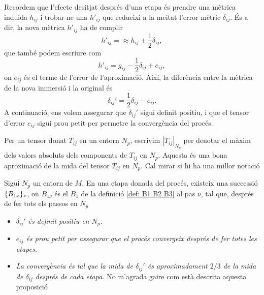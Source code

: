 Recordem que l'efecte desitjat després d'una etapa és prendre una mètrica induida $h_{ij}$ i trobar-ne una $h'_{ij}$ que redueixi a la meitat l'error mètric $\delta_{ij}$. És a dir, la nova mètrica $h'_{ij}$ ha de complir
\begin{equation}
    h'_{ij} =  \approx h_{ij} + \frac12\delta_{ij},
\end{equation}
que també podem escriure com 
\begin{equation}
    h'_{ij} = g_{ij} - \frac12\delta_{ij} + e_{ij},
\end{equation}
on $e_{ij}$ és el terme de l'error de l'aproximació. Així, la diferència entre la mètrica de la nova immersió i la original és
\begin{equation}\label{eq:delta_prima}
    \delta_{ij}' = \frac12\delta_{ij} - e_{ij}.
\end{equation}
A continuació, ens volem assegurar que $\delta_{ij}'$ sigui definit positiu, i que el tensor d'error $e_{ij}$ sigui prou petit per permetre la convergència del procés.
\begin{nota}
    Per un tensor donat $T_{ij}$ en un entorn $N_p$, escrivim $|T_{ij}|_{N_p}$ per denotar el màxim dels valors absoluts dels components de $T_{ij}$ en $N_p$. Aquesta és una bona aproximació de la mida del tensor $T_{ij}$ en $N_p$. {\color{blue} Cal mirar si hi ha una millor notació}
\end{nota}
\begin{prop}
    Sigui $N_p$ un entorn de $M$. En una etapa donada del procés, existeix una successió $\{B_{1\nu}\}_{\nu}$, on $B_{1\nu}$ és el $B_1$ de la definició \ref{def: B1 B2 B3} al pas $\nu$, tal que, després de fer tots els passos en $N_p$
\end{prop}
\begin{itemize}
    \item \textit{$\delta_{ij}'$ és definit positiu en $N_p$.}
    \item \textit{$e_{ij}$ és prou petit per assegurar que el procés convergeix després de fer totes les etapes.}
    \item \textit{La convergència és tal que la mida de $\delta_{ij}'$ és aproximadament $2/3$ de la mida de $\delta_{ij}$ després de cada etapa. }{\color{blue} No m'agrada gaire com està descrita aquesta proposició}
\end{itemize}


